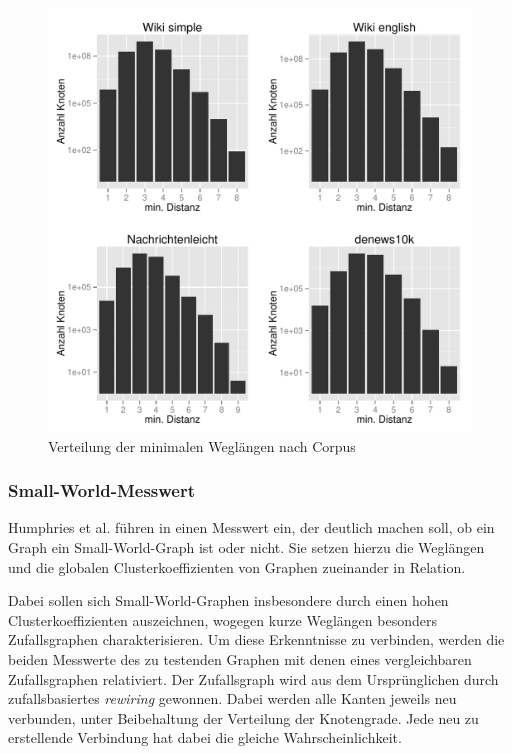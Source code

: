 \documentclass[11pt, a4paper]{article}
\begin{document}
\begin{figure}[ht]
    \centering
        \includegraphics[scale=.75]{mdh_plots.pdf}
    \caption{Verteilung der minimalen Weglängen nach Corpus}
    \label{fig-mdh}
\end{figure}


\subsubsection{Small-World-Messwert}

Humphries et al. führen in \cite{Humphries2006} einen Messwert ein, der deutlich
machen soll, ob ein Graph ein Small-World-Graph ist oder nicht. Sie setzen hierzu
die Weglängen und die globalen Clusterkoeffizienten von Graphen zueinander in 
Relation.

Dabei sollen sich Small-World-Graphen insbesondere durch einen hohen
 Clusterkoeffizienten auszeichnen, wogegen kurze Weglängen besonders
 Zufallsgraphen charakterisieren. Um diese Erkenntnisse zu verbinden, werden die
 beiden Messwerte des zu testenden Graphen mit denen eines vergleichbaren
 Zufallsgraphen relativiert. Der Zufallsgraph wird aus dem Ursprünglichen durch
 zufallsbasiertes \emph{rewiring} gewonnen.
Dabei werden alle Kanten jeweils neu verbunden, unter Beibehaltung der Verteilung
der Knotengrade.
Jede neu zu erstellende Verbindung hat dabei die gleiche Wahrscheinlichkeit.
\end{document}
